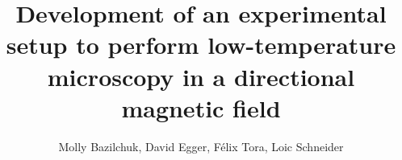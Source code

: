 \documentclass[journal]{IEEEtran}
\begin{document}
%
\title{Development of an experimental setup to perform low-temperature microscopy in a directional magnetic field}
%
%
%

\author{Molly Bazilchuk, 
David Egger, 
Félix Tora, 
Loic Schneider}%

% 
%




% 
\end{document}
